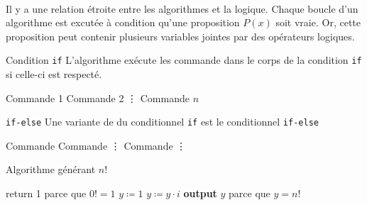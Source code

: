\documentclass[16pt]{report}
\begin{document}
\begin{multicols*}{2}
        \paragraph{}
        Il y a une relation étroite entre les algorithmes et la logique. Chaque boucle 
        d'un algorithme est excutée à condition qu'une proposition $P(x)$ soit vraie. 
        Or, cette proposition peut contenir plusieurs variables jointes par des opérateurs logiques. 
        \begin{Definitionx}{Condition \texttt{if}}{}
            L'algorithme exécute les commande dans le corps de la condition \texttt{if} si celle-ci est respecté. 
            
            \begin{algorithm}[H]
                         {
                            Commande 1\; 
                            Commande 2\;
                            \vdots
                            Commande $n$ \;
                        }
            \end{algorithm}
        \end{Definitionx}

        \begin{Definitionx}{\texttt{if-else}}{}
            Une variante de du conditionnel \texttt{if} est le conditionnel \texttt{if-else}

        \end{Definitionx}
            \begin{algorithm}[H]
                \SetAlgoLined
                \DontPrintSemicolon
                         {
                            Commande\; 
                            Commande\;
                        \vdots}
                            {Commande\;
                            \vdots\;
                            }
            \end{algorithm}

            \columnbreak

            \begin{EExample}{Algorithme générant $n!$}{}
                    \begin{algorithm}[H]
                        \SetAlgoLined 
                        \DontPrintSemicolon
                         {
                            return 1  \textcolor{myb}{\dotfill parce que $0! = 1$}  
                        }
                        {
                            $y\coloneqq 1$\;
                             {
                                $y \coloneqq y \cdot i$\;
                            }
                            \textbf{output} $y$ \textcolor{myb}{\dotfill parce que $y = n!$}
                        }
                    \end{algorithm}   
        \end{EExample}
        



\end{multicols*}
\end{document}
